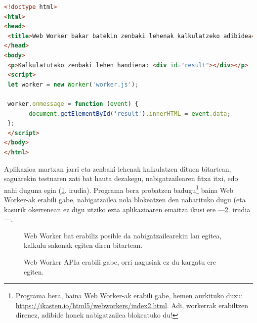 \begin{lstlisting}[numbers=none,language=HTML]
<!doctype html>
<html>
<head>
 <title>Web Worker bakar batekin zenbaki lehenak kalkulatzeko adibidea</title>
</head>
<body>
 <p>Kalkulatutako zenbaki lehen handiena: <div id="result"></div></p>
 <script>
 let worker = new Worker('worker.js');
 
 worker.onmessage = function (event) {
       document.getElementById('result').innerHTML = event.data;
 };
 </script>
</body>
</html>
\end{lstlisting}

Aplikazioa martxan jarri eta zenbaki lehenak kalkulatzen dituen bitartean, saguarekin testuaren zati bat hauta dezakegu, nabigatzailearen fitxa itxi, edo nahi duguna egin (\ref{fig:webworker2}. irudia). Programa bera probatzen badugu\footnote{Programa bera, baina Web Worker-ak erabili gabe, hemen aurkituko duzu: \href{https://ikasten.io/html5/webworkers/index2.html}{https://ikasten.io/html5/webworkers/index2.html}. Adi, workerrak erabiltzen direnez, adibide honek nabigatzailea blokeatuko du!} baina Web Worker-ak erabili gabe, nabigatzailea nola blokeatzen den nabarituko dugu (eta kasurik okerrenean ez digu utziko ezta aplikazioaren emaitza ikusi ere  —\ref{fig:webworker3}. irudia—.

\begin{figure}[ht]
	\centering
{}
\caption{Web Worker bat erabiliz posible da nabigatzailearekin lan egitea, kalkulu sakonak egiten diren bitartean.}
\label{fig:webworker2}
\end{figure}

\begin{figure}[ht]
	\centering
{}
\caption{Web Worker APIa erabili gabe, orri nagusiak ez du kargatu ere egiten.}
\label{fig:webworker3}
\end{figure}

